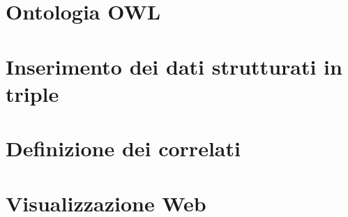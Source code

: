 \documentclass[Lau,binding=0.6cm,noexaminfo,oneside]{sapthesis}
\newcommand{\insertcode}[1]{}
\begin{document}
\section*{Ontologia OWL}
\lstset{language=XML}
\insertcode{myontology.owl}

\section*{Inserimento dei dati strutturati in triple}
\lstset{language=Python}
\insertcode{album_triples.py}
\insertcode{main.py}

\section*{Definizione dei correlati}
\lstset{language=Java}
\insertcode{Album.java}
\insertcode{MyQuery.java}
\insertcode{TFIDF.java}
\insertcode{Similarity.java}
\insertcode{Recommender.java}
\insertcode{Main.java}

\section*{Visualizzazione Web}
\lstset{language=JavaScript}
\insertcode{app.js}
\insertcode{index.js}
\lstset{language=HTML5}
\insertcode{index.ejs}
\lstset{language=JavaScript}
\insertcode{music.js}
\insertcode{query.js}
\lstset{language=HTML5}
\insertcode{table.ejs}


\backmatter
\clearpage
{}
\nocite{*}


\end{document}
